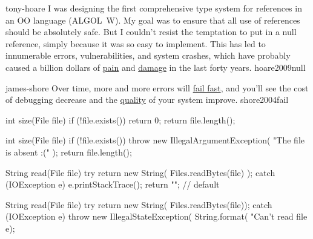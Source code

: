 \documentclass{article}
\begin{document}

\lnQuote
  {tony-hoare}
  {I was designing the first comprehensive type system for references in an OO language (ALGOL~W). My goal was to ensure that all use of references should be absolutely safe. But I couldn't resist the temptation to put in a null reference, simply because it was so easy to implement. This has led to innumerable errors, vulnerabilities, and system crashes, which have probably caused a billion dollars of \ul{pain} and \ul{damage} in the last forty years.}
  {hoare2009null}

\pptToc


\lnQuote
  {james-shore}
  {Over time, more and more errors will \ul{fail fast}, and you'll see the cost of debugging decrease and the \ul{quality} of your system improve.}
  {shore2004fail}

\begin{lnSnippet}
int size(File file) {
  if (!file.exists()) {
    return 0;
  }
  return file.length();
}
\end{lnSnippet}
\begin{lnSnippet}
int size(File file) {
  if (!file.exists()) {
    throw new IllegalArgumentException(
      "The file is absent :("
    );
  }
  return file.length();
}
\end{lnSnippet}

\begin{lnSnippet}
String read(File file) {
  try {
    return new String(
      Files.readBytes(file)
    );
  } catch (IOException e) {
    e.printStackTrace();
    return ""; // default
  }
}
\end{lnSnippet}
\begin{lnSnippet}
String read(File file) {
  try {
    return new String(
      Files.readBytes(file));
  } catch (IOException e) {
    throw new IllegalStateException(
      String.format(
        "Can't read file %
      e);
  }
}
\end{lnSnippet}
\end{document}
